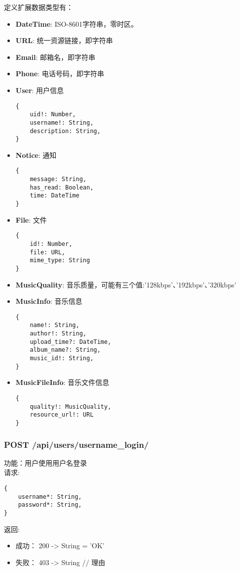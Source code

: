 定义扩展数据类型有：
\begin{itemize}
	\item \textbf{DateTime}: ISO-8601字符串，零时区。
	\item \textbf{URL}: 统一资源链接，即字符串
	\item \textbf{Email}: 邮箱名，即字符串
	\item \textbf{Phone}: 电话号码，即字符串
	\item \textbf{User}: 用户信息
\begin{lstlisting}[numbers=none, frame=none]
{
    uid!: Number,
    username!: String,
    description: String,
}
\end{lstlisting}
	\item \textbf{Notice}: 通知
\begin{lstlisting}[numbers=none, frame=none]
{
  	message: String,
  	has_read: Boolean,
  	time: DateTime
}
\end{lstlisting}
	\item \textbf{File}: 文件
\begin{lstlisting}[numbers=none, frame=none]
{
    id!: Number,
    file: URL,
    mime_type: String
}
\end{lstlisting}
\item \textbf{MusicQuality}: 音乐质量，可能有三个值:'128kbps'、'192kbps'、'320kbps'
\item \textbf{MusicInfo}: 音乐信息
\begin{lstlisting}[numbers=none, frame=none]
{
    name!: String,
    author!: String,
    upload_time?: DateTime,
    album_name?: String,
    music_id!: String,
}
\end{lstlisting}
\item \textbf{MusicFileInfo}: 音乐文件信息
\begin{lstlisting}[numbers=none, frame=none]
{
    quality!: MusicQuality,
    resource_url!: URL
}
\end{lstlisting}
\end{itemize}


\subsubsection{POST /api/users/username\_login/}

\noindent
功能：用户使用用户名登录\\
请求:
\begin{lstlisting}[numbers=none, frame=none]
{
    username*: String,
    password*: String,
}
\end{lstlisting}
返回:
\begin{itemize}
	\item 成功： 200 -> String = 'OK'
	\item 失败： 403 -> String // 理由
\end{itemize}

